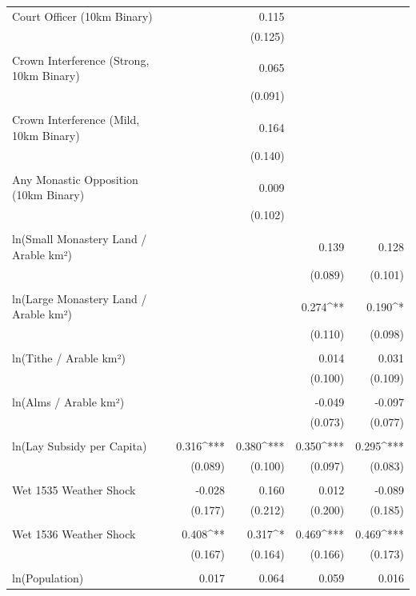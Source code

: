 \begin{table}[H]
\begin{tabular}{@{\extracolsep{.5pt}}lD{.}{.}{-3} D{.}{.}{-3} D{.}{.}{-3} D{.}{.}{-3} }
 Court Officer (10km Binary) &  & 0.115 &  &  \\ 
  &  & (0.125) &  &  \\ 
  & & & & \\ 
 Crown Interference (Strong, 10km Binary) &  & 0.065 &  &  \\ 
  &  & (0.091) &  &  \\ 
  & & & & \\ 
 Crown Interference (Mild, 10km Binary) &  & 0.164 &  &  \\ 
  &  & (0.140) &  &  \\ 
  & & & & \\ 
 Any Monastic Opposition (10km Binary) &  & 0.009 &  &  \\ 
  &  & (0.102) &  &  \\ 
  & & & & \\ 
 ln(Small Monastery Land / Arable km²) &  &  & 0.139 & 0.128 \\ 
  &  &  & (0.089) & (0.101) \\ 
  & & & & \\ 
 ln(Large Monastery Land / Arable km²) &  &  & 0.274^{**} & 0.190^{*} \\ 
  &  &  & (0.110) & (0.098) \\ 
  & & & & \\ 
 ln(Tithe / Arable km²) &  &  & 0.014 & 0.031 \\ 
  &  &  & (0.100) & (0.109) \\ 
  & & & & \\ 
 ln(Alms / Arable km²) &  &  & -0.049 & -0.097 \\ 
  &  &  & (0.073) & (0.077) \\ 
  & & & & \\ 
 ln(Lay Subsidy per Capita) & 0.316^{***} & 0.380^{***} & 0.350^{***} & 0.295^{***} \\ 
  & (0.089) & (0.100) & (0.097) & (0.083) \\ 
  & & & & \\ 
 Wet 1535 Weather Shock & -0.028 & 0.160 & 0.012 & -0.089 \\ 
  & (0.177) & (0.212) & (0.200) & (0.185) \\ 
  & & & & \\ 
 Wet 1536 Weather Shock & 0.408^{**} & 0.317^{*} & 0.469^{***} & 0.469^{***} \\ 
  & (0.167) & (0.164) & (0.166) & (0.173) \\ 
  & & & & \\ 
 ln(Population) & 0.017 & 0.064 & 0.059 & 0.016 \\ 

\end{tabular}
\end{table}
